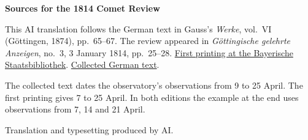 \clearpage\thispagestyle{empty}
\begin{center}\textbf{Sources for the 1814 Comet Review}\end{center}
\noindent This AI translation follows the German text in Gauss’s \textit{Werke}, vol.~VI (Göttingen, 1874), pp.~65--67. The review appeared in \textit{Göttingische gelehrte Anzeigen}, no.~3, 3 January 1814, pp.~25--28. \href{https://www.digitale-sammlungen.de/de/view/bsb10538685?page=31}{First printing at the Bayerische Staatsbibliothek}. \href{https://gdz.sub.uni-goettingen.de/id/PPN236007467}{Collected German text}.
\par\smallskip\noindent The collected text dates the observatory’s observations from 9 to 25 April. The first printing gives 7 to 25 April. In both editions the example at the end uses observations from 7, 14 and 21 April.
\par\smallskip\noindent Translation and typesetting produced by AI.
\clearpage
